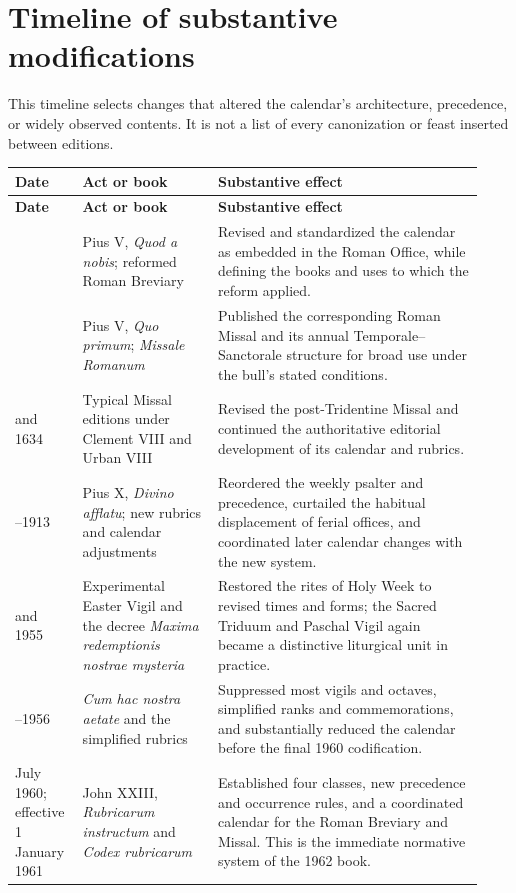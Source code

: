 \section{Timeline of substantive modifications}

This timeline selects changes that altered the calendar's architecture, precedence, or widely observed contents. It is not a list of every canonization or feast inserted between editions.

\begin{longtable}{@{}>{\RaggedRight\arraybackslash}p{0.13\linewidth}>{\RaggedRight\arraybackslash}p{0.27\linewidth}>{\RaggedRight\arraybackslash}p{0.53\linewidth}@{}}
\toprule
\textbf{Date} & \textbf{Act or book} & \textbf{Substantive effect}\\
\midrule
\endfirsthead
\toprule
\textbf{Date} & \textbf{Act or book} & \textbf{Substantive effect}\\
\midrule
\endhead
\bottomrule
\endfoot
1568 & Pius V, \emph{Quod a nobis}; reformed Roman Breviary & Revised and standardized the calendar as embedded in the Roman Office, while defining the books and uses to which the reform applied.\\
1570 & Pius V, \emph{Quo primum}; \emph{Missale Romanum} & Published the corresponding Roman Missal and its annual Temporale--Sanctorale structure for broad use under the bull's stated conditions.\\
1604 and 1634 & Typical Missal editions under Clement VIII and Urban VIII & Revised the post-Tridentine Missal and continued the authoritative editorial development of its calendar and rubrics.\\
1911--1913 & Pius X, \emph{Divino afflatu}; new rubrics and calendar adjustments & Reordered the weekly psalter and precedence, curtailed the habitual displacement of ferial offices, and coordinated later calendar changes with the new system.\\
1951 and 1955 & Experimental Easter Vigil and the decree \emph{Maxima redemptionis nostrae mysteria} & Restored the rites of Holy Week to revised times and forms; the Sacred Triduum and Paschal Vigil again became a distinctive liturgical unit in practice.\\
1955--1956 & \emph{Cum hac nostra aetate} and the simplified rubrics & Suppressed most vigils and octaves, simplified ranks and commemorations, and substantially reduced the calendar before the final 1960 codification.\\
25 July 1960; effective 1 January 1961 & John XXIII, \emph{Rubricarum instructum} and \emph{Codex rubricarum} & Established four classes, new precedence and occurrence rules, and a coordinated calendar for the Roman Breviary and Missal. This is the immediate normative system of the 1962 book.\\

\end{longtable}
